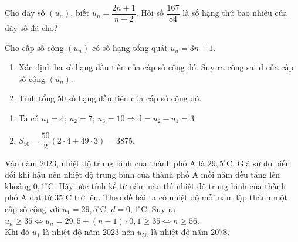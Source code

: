\begin{bt}%
    Cho dãy số $(u_n)$, biết $u_n=\dfrac{2n+1}{n+2}$. Hỏi số $\dfrac{167}{84}$ là số hạng thứ bao nhiêu của dãy số đã cho?
\end{bt}
\begin{bt}%
    Cho cấp số cộng $\left(u_n\right)$ có số hạng tổng quát $u_n=3 n+1$.
    \begin{enumerate}
        \item Xác định ba số hạng đầu tiên của cấp số cộng đó. Suy ra công sai $\mathrm{d}$ của cấp số cộng $\left(u_n\right)$.
        \item Tính tổng $50$ số hạng đầu tiên của cấp số cộng đó.
    \end{enumerate}
    \loigiai
    {
        \begin{enumerate}
            \item Ta có $
            u_1=4$; $u_2=7$; $u_3=10 \Rightarrow \mathrm{d}=u_2-u_1=3
            $.
            \item $
            S_{50}=\dfrac{50}{2}(2\cdot 4+49\cdot 3)=3875
            $.
        \end{enumerate}
    }
\end{bt}
\begin{bt}%
    Vào năm $2023$, nhiệt độ trung bình của thành phố $\mathrm{A}$ là $29{,}5^{\circ} \mathrm{C}$. Giả sử do biến đổi khí hậu nên nhiệt độ trung bình của thành phố $\mathrm{A}$ mỗi năm đều tăng lên khoảng $0{,}1^{\circ} \mathrm{C}$. Hãy ước tính kể từ năm nào thì nhiệt độ trung bình của thành phố $\mathrm{A}$ đạt từ $35^{\circ} \mathrm{C}$ trở lên.
    \loigiai
    { Theo đề bài ta có nhiệt độ mỗi năm lập thành một cấp số cộng với  $u_1=29{,}5^\circ \mathrm{C},\, d=0{,}1^\circ \mathrm{C}$.
        Suy ra
        $u_n \geq 35 \Leftrightarrow u_n=29{,}5+(n-1) \cdot 0{,}1 \geq 35
        \Leftrightarrow n \geq 56$.\\
        Khi đó $u_1$ là nhiệt độ năm 2023 nên $u_{56}$ là nhiệt độ năm $2078$.
    }
\end{bt}
